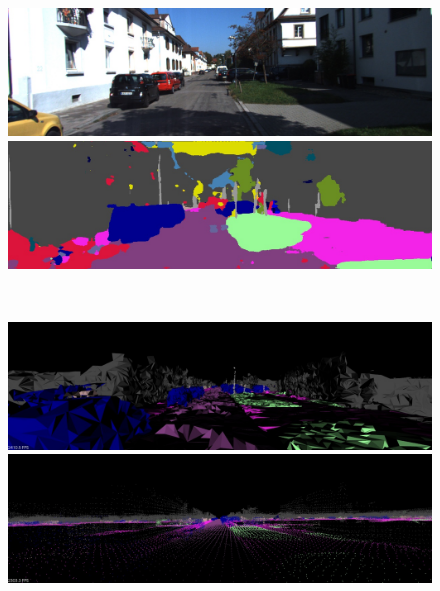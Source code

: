 \begin{figure}[htbp]
 \begin{minipage}[b]{0.50\hsize}
 \begin{center}
  \includegraphics[keepaspectratio, scale=0.18]{./picture/bgrimage/bgrimage12.jpg}
  \end{center}
 \end{minipage}
 \begin{minipage}[b]{0.5\hsize}
 \begin{center}
  \includegraphics[keepaspectratio, scale=0.18]{./picture/segimage/image12.jpg}
  \end{center}
 \end{minipage} \\
 \begin{minipage}[b]{0.50\hsize}
 \begin{center}
  \includegraphics[keepaspectratio, scale=0.18]{./picture/mesh_map_image/image12.jpg}
  \end{center}
 \end{minipage}
 \begin{minipage}[b]{0.50\hsize}
 \begin{center}
  \includegraphics[keepaspectratio, scale=0.18]{./picture/point_map_image/image12.jpg}

\end{center}
\end{minipage}
\end{figure}
